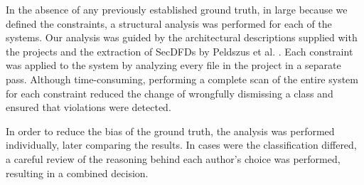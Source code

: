 In the absence of any previously established ground truth, in large because we defined the constraints, a structural analysis was performed for each of the systems. Our analysis was guided by the architectural descriptions supplied with the projects and the extraction of SecDFDs by Peldszus et al. \cite{peldszus_secure_2019}. Each constraint was applied to the system by analyzing every file in the project in a separate pass. Although time-consuming, performing a complete scan of the entire system for each constraint reduced the change of wrongfully dismissing a class and ensured that violations were detected.

In order to reduce the bias of the ground truth, the analysis was performed individually, later comparing the results. In cases were the classification differed, a careful review of the reasoning behind each author's choice was performed, resulting in a combined decision. 




